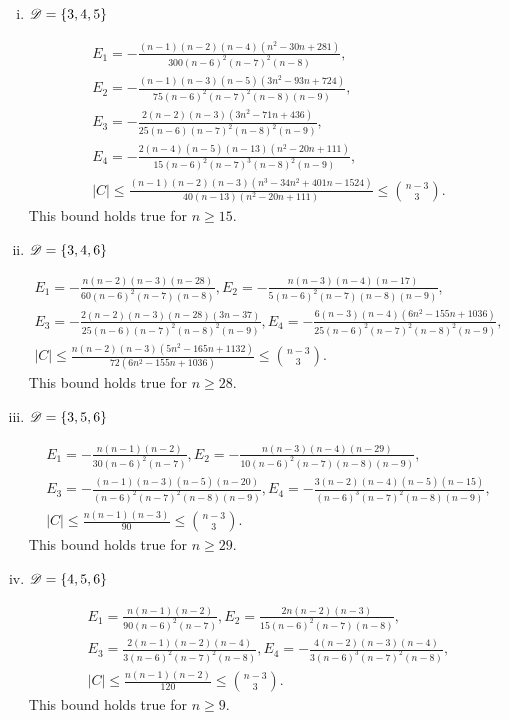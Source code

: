\documentclass{amsart}
\begin{document}
{\begin{enumerate}[(i)]
\item $\mathscr{D}=\{3,4,5\}$

\begin{gather*}
E_1=-\frac{(n-1)(n-2)(n-4)\left(n^2-30n+281\right)}{300(n-6)^2(n-7)^2(n-8)},\\ 
E_2=-\frac{(n-1)(n-3)(n-5)\left(3n^2-93n+724\right)}{75(n-6)^2(n-7)^2(n-8)(n-9)},\\ 
E_3=-\frac{2(n-2)(n-3)\left(3n^2-71n+436\right)}{25(n-6)(n-7)^2(n-8)^2(n-9)},\\
E_4=-\frac{2(n-4)(n-5)(n-13)\left(n^2-20n+111\right)}{15(n-6)^2(n-7)^3(n-8)^2(n-9)},\\
|C|\le \frac{(n-1)(n-2)(n-3)\left(n^3-34n^2+401n-1524\right)}{40(n-13)\left(n^2-20n+111\right)} \leq \binom{n-3}{3}.
\end{gather*}
This bound holds true for $n\ge 15.$

\item $\mathscr{D}=\{3,4,6\}$

\begin{gather*}
E_1=-\frac{n(n-2)(n-3)(n-28)}{60(n-6)^2(n-7)(n-8)}, E_2=-\frac{n(n-3)(n-4)(n-17)}{5(n-6)^2(n-7)(n-8)(n-9)},\\ 
E_3=-\frac{2(n-2)(n-3)(n-28)(3n-37)}{25(n-6)(n-7)^2(n-8)^2(n-9)},E_4=-\frac{6(n-3)(n-4)\left(6n^2-155n+1036\right)}{25(n-6)^2(n-7)^2(n-8)^2(n-9)},\\
|C|\le \frac{n(n-2)(n-3)\left(5n^2-165n+1132\right)}{72\left(6n^2-155n+1036\right)} \leq \binom{n-3}{3}.
\end{gather*}
This bound holds true for $n\ge 28.$

\item $\mathscr{D}=\{3,5,6\}$

\begin{gather*}
E_1=-\frac{n(n-1)(n-2)}{30(n-6)^2(n-7)},E_2=-\frac{n(n-3)(n-4)(n-29)}{10(n-6)^2(n-7)(n-8)(n-9)},\\ 
E_3=-\frac{(n-1)(n-3)(n-5)(n-20)}{(n-6)^2(n-7)^2(n-8)(n-9)}, E_4=-\frac{3(n-2)(n-4)(n-5)(n-15)}{(n-6)^3(n-7)^2(n-8)(n-9)},\\
|C|\le \frac{n(n-1)(n-3)}{90} \leq \binom{n-3}{3}.
\end{gather*}
This bound holds true for $n\ge 29.$

\item $\mathscr{D}=\{4,5,6\}$

\begin{gather*}
E_1=\frac{n(n-1)(n-2)}{90(n-6)^2(n-7)}, E_2=\frac{2n(n-2)(n-3)}{15(n-6)^2(n-7)(n-8)},\\ E_3=\frac{2(n-1)(n-2)(n-4)}{3(n-6)^2(n-7)^2(n-8)},
E_4=-\frac{4(n-2)(n-3)(n-4)}{3(n-6)^3(n-7)^2(n-8)},\\
|C|\le \frac{n(n-1)(n-2)}{120} \leq \binom{n-3}{3}.
\end{gather*}
This bound holds true for $n\ge 9.$


\end{enumerate}}
\end{document}
